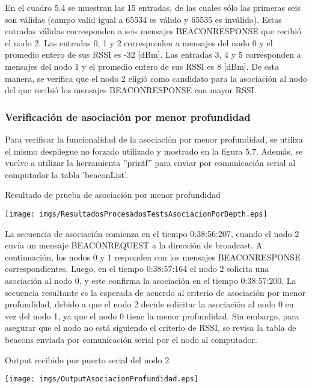 En el cuadro 5.4 se muestran las 15 entradas, de las cuales sólo las primeras seis son válidas (campo valid igual a 65534 es válido y 65535 es inválido). Estas entradas válidas corresponden a seis mensajes BEACON\textunderscore RESPONSE que recibió el nodo 2. Las entradas 0, 1 y 2 corresponden a mensajes del nodo 0 y el promedio entero de sus RSSI es -32 [dBm]. Las entradas 3, 4 y 5 corresponden a mensajes del nodo 1 y el promedio entero de sus RSSI es 8 [dBm]. De esta manera, se verifica que el nodo 2 eligió como candidato para la asociación al nodo del que recibió los mensajes BEACON\textunderscore RESPONSE con mayor RSSI.\\

\subsubsection{Verificación de asociación por menor profundidad}
Para verificar la funcionalidad de la asociación por menor profundidad, se utiliza el mismo despliegue no forzado utilizado y mostrado en la figura 5.7. Además, se vuelve a utilizar la herramienta ''printf'' para enviar por comunicación serial al computador la tabla 'beaconList'.

\begin{center}
\begin{table}[H]
\caption{Resultado de prueba de asociación por menor profundidad}
 \texttt{[image: imgs/ResultadosProcesadosTestsAsociacionPorDepth.eps]}
\end{table}
\end{center}

La secuencia de asociación comienza en el tiempo 0:38:56:207, cuando el nodo 2 envía un mensaje BEACON\textunderscore REQUEST a la dirección de broadcast. A continuación, los nodos 0 y 1 responden con los mensajes BEACON\textunderscore RESPONSE correspondientes. Luego, en el tiempo 0:38:57:164 el nodo 2 solicita una asociación al nodo 0, y este confirma la asociación en el tiempo 0:38:57:200. La secuencia resultante es la esperada de acuerdo al criterio de asociación por menor profundidad, debido a que el nodo 2 decide solicitar la asociación al nodo 0 en vez del nodo 1, ya que el nodo 0 tiene la menor profundidad. Sin embargo, para asegurar que el nodo no está siguiendo el criterio de RSSI, se revisa la tabla de beacons enviada por comunicación serial por el nodo al computador.

\begin{center}
\begin{table}[H]
\caption{Output recibido por puerto serial del nodo 2}
 \texttt{[image: imgs/OutputAsociacionProfundidad.eps]}
\end{table}
\end{center}

